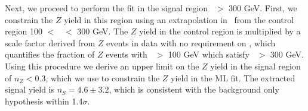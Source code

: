 Next, we proceed to perform the fit in the signal region \Ht\ $>$ 300 GeV. First, we
constrain the $Z$ yield in this region using an extrapolation in \Ht\ from the 
control region 100 $<$ \Ht\ $<$ 300 GeV. The $Z$ yield in the control region is
multiplied by a scale factor derived from $Z$ events in data with no requirement
on \MET, which quantifies the fraction of $Z$ events with \Ht\ $>$ 100 GeV which 
satisfy \Ht\ $>$ 300 GeV. Using this procedure we derive an upper limit on the
$Z$ yield in the signal region of $n_Z < 0.3$, which we use to constrain the
$Z$ yield in the ML fit. The extracted signal yield is $n_S = 4.6 \pm 3.2$,
which is consistent with the background only hypothesis within 1.4$\sigma$. 





